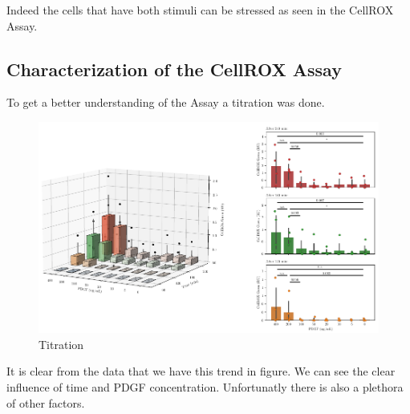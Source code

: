     Indeed the cells that have both stimuli can be stressed as seen in the CellROX Assay.

    \subsection{Characterization of the CellROX Assay}
    To get a better understanding of the Assay a titration was done.

    \begin{figure}[h]
    \capstart
        \centering
    	\includegraphics{Abbildung/CellROX_titration_no_norm.pdf}

    	\begin{minipage}{\captionwidth}
    		\caption[cellROX_titration]{ \newline Titration}
    		\label{fig:qPCR}
    	\end{minipage}
    \end{figure}

    It is clear from the data that we have this trend in figure. We can see the clear influence of time and PDGF concentration. Unfortunatly there is also a plethora of other factors.

